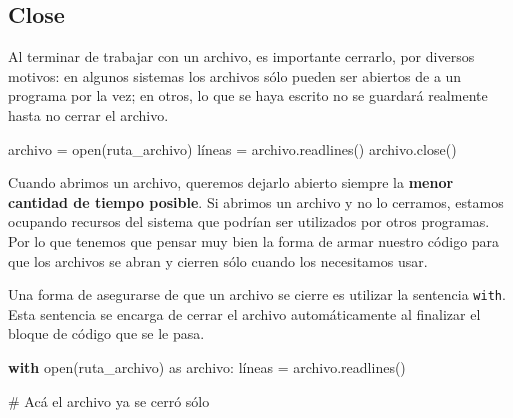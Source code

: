 \documentclass[
  letterpaper,
  DIV=11,
  numbers=noendperiod]{scrreprt}
\newenvironment{Shaded}{\begin{snugshade}}{\end{snugshade}}
\newcommand{\BuiltInTok}[1]{\textcolor[rgb]{0.00,0.23,0.31}{#1}}
\newcommand{\CommentTok}[1]{\textcolor[rgb]{0.37,0.37,0.37}{#1}}
\newcommand{\ControlFlowTok}[1]{\textcolor[rgb]{0.00,0.23,0.31}{\textbf{#1}}}
\newcommand{\ImportTok}[1]{\textcolor[rgb]{0.00,0.46,0.62}{#1}}
\newcommand{\NormalTok}[1]{\textcolor[rgb]{0.00,0.23,0.31}{#1}}
\newcommand{\OperatorTok}[1]{\textcolor[rgb]{0.37,0.37,0.37}{#1}}
\begin{document}
\subsection{Close}\label{close}

Al terminar de trabajar con un archivo, es importante cerrarlo, por
diversos motivos: en algunos sistemas los archivos sólo pueden ser
abiertos de a un programa por la vez; en otros, lo que se haya escrito
no se guardará realmente hasta no cerrar el archivo.

\begin{Shaded}
\begin{Highlighting}[]
\NormalTok{archivo }\OperatorTok{=} \BuiltInTok{open}\NormalTok{(ruta\_archivo)}
\NormalTok{líneas }\OperatorTok{=}\NormalTok{ archivo.readlines()}
\NormalTok{archivo.close()}
\end{Highlighting}
\end{Shaded}

\begin{tcolorbox}[enhanced jigsaw, opacitybacktitle=0.6, toptitle=1mm, toprule=.15mm, arc=.35mm, breakable, bottomrule=.15mm, opacityback=0, leftrule=.75mm, rightrule=.15mm, title=\textcolor{quarto-callout-warning-color}{\faExclamationTriangle}\hspace{0.5em}{Warning}, left=2mm, bottomtitle=1mm, colframe=quarto-callout-warning-color-frame, colback=white, titlerule=0mm, coltitle=black, colbacktitle=quarto-callout-warning-color!10!white]

Cuando abrimos un archivo, queremos dejarlo abierto siempre la
\textbf{menor cantidad de tiempo posible}. Si abrimos un archivo y no lo
cerramos, estamos ocupando recursos del sistema que podrían ser
utilizados por otros programas. Por lo que tenemos que pensar muy bien
la forma de armar nuestro código para que los archivos se abran y
cierren sólo cuando los necesitamos usar.

\end{tcolorbox}

Una forma de asegurarse de que un archivo se cierre es utilizar la
sentencia \texttt{with}. Esta sentencia se encarga de cerrar el archivo
automáticamente al finalizar el bloque de código que se le pasa.

\begin{Shaded}
\begin{Highlighting}[]
\ControlFlowTok{with} \BuiltInTok{open}\NormalTok{(ruta\_archivo) }\ImportTok{as}\NormalTok{ archivo:}
\NormalTok{  líneas }\OperatorTok{=}\NormalTok{ archivo.readlines()}

\CommentTok{\# Acá el archivo ya se cerró sólo}
\end{Highlighting}
\end{Shaded}
\end{document}
